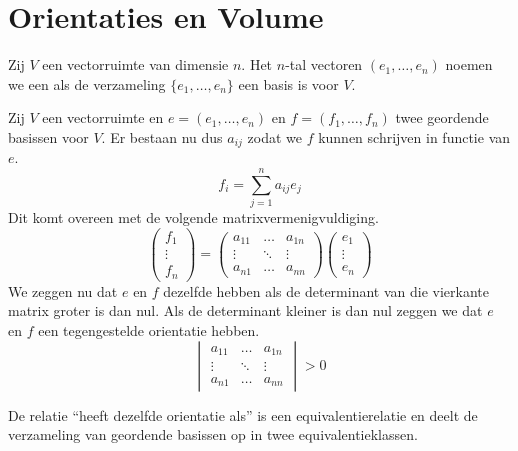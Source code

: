 \documentclass[main.tex]{subfiles}
\begin{document}
\chapter{Orientaties en Volume}
\label{cha:orientaties-en-volume}

\begin{de}
  Zij $V$ een vectorruimte van dimensie $n$.
  Het $n$-tal vectoren $(e_{1},\dotsc, e_{n})$ noemen we een  als de verzameling $\{e_{1}, \dotsc, e_{n} \}$ een basis is voor $V$.
\end{de}

\begin{de}
  Zij $V$ een vectorruimte en $e = (e_{1},\dotsc, e_{n})$ en $f = (f_{1},\dotsc, f_{n})$ twee geordende basissen voor $V$.
  Er bestaan nu dus $a_{ij}$ zodat we $f$ kunnen schrijven in functie van $e$.
  \[ f_{i} = \sum_{j=1}^{n}a_{ij}e_{j} \]
  Dit komt overeen met de volgende matrixvermenigvuldiging.
  \[
  \begin{pmatrix}
    f_{1}\\\vdots \\f_{n}
  \end{pmatrix}
    =
  \begin{pmatrix}
    a_{11} & \hdots & a_{1n} \\
    \vdots & \ddots & \vdots \\
    a_{n1} & \hdots & a_{nn}
  \end{pmatrix}
  \begin{pmatrix}
    e_{1}\\\vdots \\e_{n}
  \end{pmatrix}
  \]
  We zeggen nu dat $e$ en $f$ dezelfde  hebben als de determinant van die vierkante matrix groter is dan nul. Als de determinant kleiner is dan nul zeggen we dat $e$ en $f$ een tegengestelde orientatie hebben.
  \[ 
  \begin{vmatrix}
    a_{11} & \hdots & a_{1n} \\
    \vdots & \ddots & \vdots \\
    a_{n1} & \hdots & a_{nn}
  \end{vmatrix}
  > 0
  \]
\end{de}

\begin{ei}
  De relatie ``heeft dezelfde orientatie als'' is een equivalentierelatie en deelt de verzameling van geordende basissen op in twee equivalentieklassen.
\end{ei}
\end{document}

